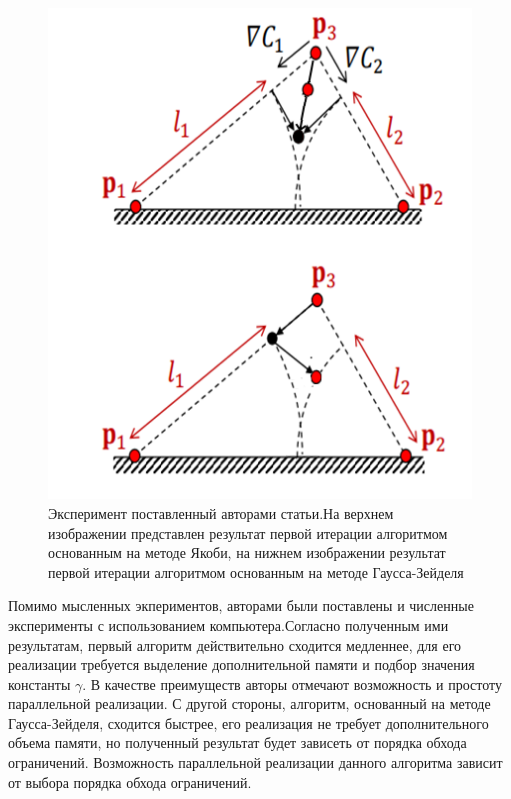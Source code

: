 	\begin{figure}[h!] 
		\center
		\includegraphics [scale=0.49] {my_folder/images//jacobi_vs_gauss}
		\caption{Эксперимент поставленный авторами статьи.\newline На верхнем изображении представлен результат первой итерации алгоритмом основанным на методе Якоби, на нижнем изображении результат первой итерации алгоритмом основанным на методе Гаусса-Зейделя}
		\label{fig:jacobi_vs_gauss}  
	\end{figure}
	\FloatBarrier
	 
	Помимо мысленных экпериментов, авторами были поставлены и численные эксперименты с использованием компьютера.Согласно полученным ими результатам, первый алгоритм действительно сходится медленнее, для его реализации требуется выделение дополнительной памяти и подбор значения константы $\gamma$. В качестве преимуществ авторы отмечают возможность и простоту параллельной реализации. С другой стороны, алгоритм, основанный на методе Гаусса-Зейделя, сходится быстрее, его реализация не требует дополнительного объема памяти, но полученный результат будет зависеть от порядка обхода ограничений. Возможность параллельной реализации данного алгоритма зависит от выбора порядка обхода ограничений.

%
